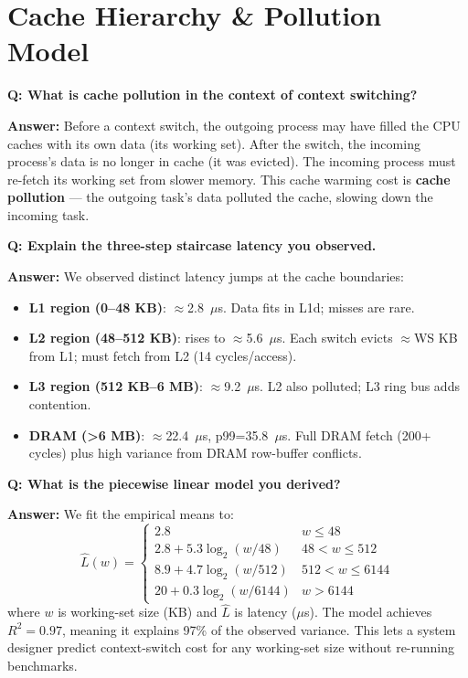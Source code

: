 \documentclass[12pt,a4paper]{article}
\newcommand{\Q}[1]{\begin{mdframed}[style=qbox]
\textbf{\textcolor{qcol}{Q: #1}}\end{mdframed}\vspace{2pt}}
\newcommand{\A}[1]{\begin{mdframed}[style=abox]
\textbf{\textcolor{acol}{Answer:}} #1\end{mdframed}\vspace{10pt}}
\begin{document}
\section{Cache Hierarchy \& Pollution Model}

\Q{What is cache pollution in the context of context switching?}
\A{Before a context switch, the outgoing process may have filled the CPU caches with its own data (its working set). After the switch, the incoming process's data is no longer in cache (it was evicted). The incoming process must re-fetch its working set from slower memory. This cache warming cost is \textbf{cache pollution} --- the outgoing task's data polluted the cache, slowing down the incoming task.}

\Q{Explain the three-step staircase latency you observed.}
\A{We observed distinct latency jumps at the cache boundaries:
\begin{itemize}[nosep]
  \item \textbf{L1 region (0--48 KB)}: $\approx$2.8~$\mu$s. Data fits in L1d; misses are rare.
  \item \textbf{L2 region (48--512 KB)}: rises to $\approx$5.6~$\mu$s. Each switch evicts $\approx$WS KB from L1; must fetch from L2 (14 cycles/access).
  \item \textbf{L3 region (512 KB--6 MB)}: $\approx$9.2~$\mu$s. L2 also polluted; L3 ring bus adds contention.
  \item \textbf{DRAM (>6 MB)}: $\approx$22.4~$\mu$s, p99=35.8~$\mu$s. Full DRAM fetch (200+ cycles) plus high variance from DRAM row-buffer conflicts.
\end{itemize}}

\Q{What is the piecewise linear model you derived?}
\A{We fit the empirical means to:
\[
  \hat{L}(w) = \begin{cases}
    2.8 & w \le 48\\
    2.8 + 5.3\log_2(w/48) & 48 < w \le 512\\
    8.9 + 4.7\log_2(w/512) & 512 < w \le 6144\\
    20 + 0.3\log_2(w/6144) & w > 6144
  \end{cases}
\]
where $w$ is working-set size (KB) and $\hat{L}$ is latency ($\mu$s). The model achieves $R^2=0.97$, meaning it explains 97\% of the observed variance. This lets a system designer predict context-switch cost for any working-set size without re-running benchmarks.}
\end{document}

